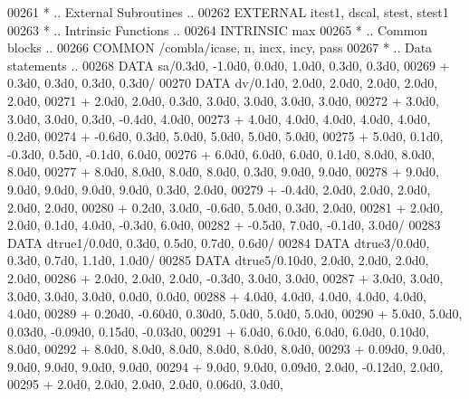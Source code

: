 \begin{DoxyCode}
00261 \textcolor{comment}{*     .. External Subroutines ..}
00262       \textcolor{keywordtype}{EXTERNAL}          itest1, dscal, stest, stest1
00263 \textcolor{comment}{*     .. Intrinsic Functions ..}
00264       \textcolor{keywordtype}{INTRINSIC}         max
00265 \textcolor{comment}{*     .. Common blocks ..}
00266       \textcolor{keyword}{COMMON}            /combla/icase, n, incx, incy, pass
00267 \textcolor{comment}{*     .. Data statements ..}
00268       \textcolor{keyword}{DATA}              sa/0.3d0, -1.0d0, 0.0d0, 1.0d0, 0.3d0, 0.3d0,
00269      +                  0.3d0, 0.3d0, 0.3d0, 0.3d0/
00270       \textcolor{keyword}{DATA}              dv/0.1d0, 2.0d0, 2.0d0, 2.0d0, 2.0d0, 2.0d0,
00271      +                  2.0d0, 2.0d0, 0.3d0, 3.0d0, 3.0d0, 3.0d0, 3.0d0,
00272      +                  3.0d0, 3.0d0, 3.0d0, 0.3d0, -0.4d0, 4.0d0,
00273      +                  4.0d0, 4.0d0, 4.0d0, 4.0d0, 4.0d0, 0.2d0,
00274      +                  -0.6d0, 0.3d0, 5.0d0, 5.0d0, 5.0d0, 5.0d0,
00275      +                  5.0d0, 0.1d0, -0.3d0, 0.5d0, -0.1d0, 6.0d0,
00276      +                  6.0d0, 6.0d0, 6.0d0, 0.1d0, 8.0d0, 8.0d0, 8.0d0,
00277      +                  8.0d0, 8.0d0, 8.0d0, 8.0d0, 0.3d0, 9.0d0, 9.0d0,
00278      +                  9.0d0, 9.0d0, 9.0d0, 9.0d0, 9.0d0, 0.3d0, 2.0d0,
00279      +                  -0.4d0, 2.0d0, 2.0d0, 2.0d0, 2.0d0, 2.0d0,
00280      +                  0.2d0, 3.0d0, -0.6d0, 5.0d0, 0.3d0, 2.0d0,
00281      +                  2.0d0, 2.0d0, 0.1d0, 4.0d0, -0.3d0, 6.0d0,
00282      +                  -0.5d0, 7.0d0, -0.1d0, 3.0d0/
00283       \textcolor{keyword}{DATA}              dtrue1/0.0d0, 0.3d0, 0.5d0, 0.7d0, 0.6d0/
00284       \textcolor{keyword}{DATA}              dtrue3/0.0d0, 0.3d0, 0.7d0, 1.1d0, 1.0d0/
00285       \textcolor{keyword}{DATA}              dtrue5/0.10d0, 2.0d0, 2.0d0, 2.0d0, 2.0d0,
00286      +                  2.0d0, 2.0d0, 2.0d0, -0.3d0, 3.0d0, 3.0d0,
00287      +                  3.0d0, 3.0d0, 3.0d0, 3.0d0, 3.0d0, 0.0d0, 0.0d0,
00288      +                  4.0d0, 4.0d0, 4.0d0, 4.0d0, 4.0d0, 4.0d0,
00289      +                  0.20d0, -0.60d0, 0.30d0, 5.0d0, 5.0d0, 5.0d0,
00290      +                  5.0d0, 5.0d0, 0.03d0, -0.09d0, 0.15d0, -0.03d0,
00291      +                  6.0d0, 6.0d0, 6.0d0, 6.0d0, 0.10d0, 8.0d0,
00292      +                  8.0d0, 8.0d0, 8.0d0, 8.0d0, 8.0d0, 8.0d0,
00293      +                  0.09d0, 9.0d0, 9.0d0, 9.0d0, 9.0d0, 9.0d0,
00294      +                  9.0d0, 9.0d0, 0.09d0, 2.0d0, -0.12d0, 2.0d0,
00295      +                  2.0d0, 2.0d0, 2.0d0, 2.0d0, 0.06d0, 3.0d0,

\end{DoxyCode}
